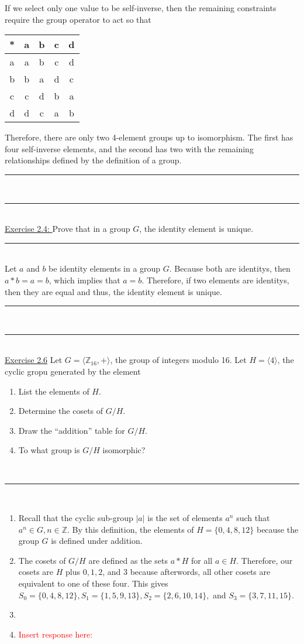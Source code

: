 \documentclass{article}
\newcommand{\problemsep}{\leavevmode\\[0.05in] \rule[\baselineskip/4]{\textwidth}{1pt} \\[0.005in] \rule[\baselineskip]{\textwidth}{1pt}\vspace{-\baselineskip}\leavevmode\\[0.05in]}
\newcommand{\statementsep}{\leavevmode\\[0.005in] \rule[\baselineskip/4]{\textwidth}{0.4pt}\leavevmode\\[0.005in]}
\begin{document}
If we select only one value to be self-inverse, then the remaining constraints require the group operator to act so that \begin{center}
	\begin{tabular}{c | c c c c}
	* & a & b & c & d \\ \hline
  a & a & b & c & d \\ 
  b & b & a & d & c \\
  c & c & d & b & a \\
  d & d & c & a & b \\
\end{tabular}
\end{center} 
Therefore, there are only two 4-element groups up to isomorphism. The first has four self-inverse elements, and the second has two with the remaining relationships defined by the definition of a group.
\problemsep
\noindent\underline{Exercise 2.4: } 
Prove that in a group $G$, the identity element is unique.
\statementsep
Let $a$ and $b$ be identity elements in a group $G$. Because both are identitys, then $a*b = a = b$, which implies that $a = b$. Therefore, if two elements are identitys, then they are equal and thus, the identity element is unique.
\problemsep
\noindent\underline{Exercise 2.6}
Let $G = \langle \mathbb{Z}_{16},+ \rangle$, the group of integers modulo 16. Let $H = \langle 4\rangle$, the cyclic gropu generated by the element %
\begin{enumerate}
	\item List the elements of $H$.
	\item Determine the cosets of $G/H$.
	\item Draw the ``addition'' table for $G/H$.
	\item To what group is $G/H$ isomorphic?
\end{enumerate}
\statementsep
\begin{enumerate}
	\item Recall that the cyclic sub-group $\lvert a \rvert$ is the set of elements $a^n$ such that $a^n \in G, n \in \mathbb{Z}$. By this definition, the elements of $H = \{ 0, 4, 8, 12 \}$ because the group $G$ is defined under addition.
	\item The cosets of $G/H$ are defined as the sets $a*H$ for all $a \in H$. Therefore, our cosets are $H$ plus $0, 1, 2$, and $3$ because afterwords, all other cosets are equivalent to one of these four. This gives $S_0 = \{ 0, 4, 8, 12\}, S_1 = \{1, 5, 9, 13\}, S_2 = \{2, 6, 10, 14\},$ and $S_3 = \{3, 7, 11, 15\}$.
	\item         
	\item \textcolor{red}{Insert response here: }	
\end{enumerate}
\end{document}
